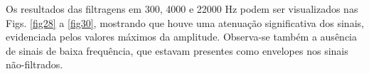 


Os resultados das filtragens em 300, 4000 e 22000 Hz podem ser visualizados nas Figs. \ref{fig28} a \ref{fig30}, mostrando %
que houve uma atenuação significativa dos sinais, evidenciada pelos valores máximos da amplitude. Observa-se também a ausência de sinais de baixa frequência, que estavam presentes como envelopes nos sinais não-filtrados.







